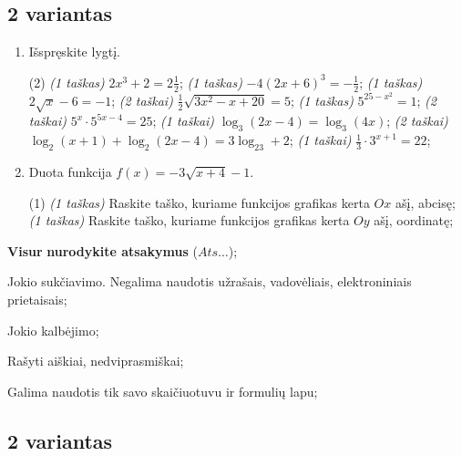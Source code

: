 \documentclass[a4paper]{article}
\begin{document}
\vspace*{12mm}
\subsection*{2 variantas}

\begin{enumerate}
	\item Išspręskite lygtį.
	\begin{tasks}[item-format={\normalfont}, after-item-skip=2mm](2)
		\task \textit{(1 taškas)} $2x^3+2=2\frac{1}{2}$;
		\task \textit{(1 taškas)} $-4(2x+6)^3=-\frac{1}{2}$;
		\task \textit{(1 taškas)} $2\sqrt{x}-6=-1$;
		\task \textit{(2 taškai)} $\frac{1}{2}\sqrt{3x^2-x+20}=5$;
		\task \textit{(1 taškas)} $5^{25-x^2}=1$;
		\task \textit{(2 taškai)} $5^x\cdot5^{5x-4}=25$;
		\task \textit{(1 taškai)} $\log_3(2x-4)=\log_3(4x)$;
		\task \textit{(2 taškai)} $\log _2\left(x+1\right)+\log _2\left(2x-4\right)=3\log _23+2$;
		\task \textit{(1 taškai)} $\frac{1}{3}\cdot 3^{x+1}=22$;
	\end{tasks}
	
	\item Duota funkcija $f(x)=-3\sqrt{x+4}-1$.
	\begin{tasks}[item-format={\normalfont}, after-item-skip=2mm](1)
		\task \textit{(1 taškas)} Raskite taško, kuriame funkcijos grafikas kerta $Ox$ ašį, abcisę;
		\task \textit{(1 taškas)} Raskite taško, kuriame funkcijos grafikas kerta $Oy$ ašį, oordinatę;
	\end{tasks}
\end{enumerate}

\begin{small}
      \begin{enumerate*}[label={(\arabic*)}]
            \item \textbf{Visur} \textbf{nurodykite atsakymus} ($Ats\ldots$);
            \item Jokio sukčiavimo. Negalima naudotis užrašais, vadovėliais,
            elektroniniais prietaisais;
            \item Jokio kalbėjimo;
            \item Rašyti aiškiai, nedviprasmiškai;
            \item Galima naudotis tik savo skaičiuotuvu ir formulių lapu;
      \end{enumerate*}
\end{small}

\vspace*{12mm}
\subsection*{2 variantas}
\end{document}
